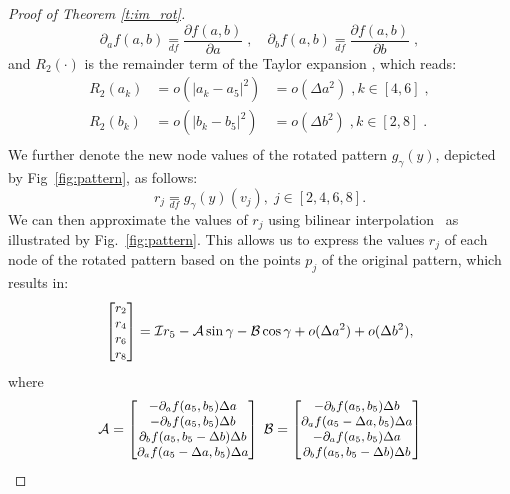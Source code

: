 \documentclass[10pt,journal,compsoc]{IEEEtran}
\newcommand{\df}{\mathop{=}\limits_{df}}
\begin{document}
\begin{proof}[Proof of Theorem \ref{t:im_rot}]
		\begin{equation}
		\partial_a f(a,b) \df \frac{\partial f(a, b)}{\partial a}\;, \quad \partial_b f(a,b) \df \frac{\partial f(a, b)}{\partial b} \;,
		\end{equation}
		and $R_2(\cdot)$ is the remainder term of the Taylor expansion%
		, which reads:
		\begin{equation}
		\begin{array}{rll}
		R_2(a_k) &= o(|a_k-a_5|^2) &= o(\Delta a^2) \;, k \in [4,6] \;, \\
		R_2(b_k) &= o(|b_k-b_5|^2) &= o(\Delta b^2) \;, k \in [2,8] \;.\\
		\end{array}
		\end{equation}
		\noindent
		We further denote the new node values of the rotated pattern $g_\gamma(y)$, depicted by Fig~\ref{fig:pattern}, as follows:
		\begin{equation}
		r_j \df g_\gamma(y)(v_j),\;  j \in [2,4,6,8].
		\label{eq:rj}
		\end{equation}
		\noindent
		We can then approximate the values of $r_j$ using bilinear interpolation~\cite{bb:Szeliski10} as illustrated by Fig.~\ref{fig:pattern}. This allows us to express the values $r_j$ of each node of the rotated pattern based on the points $p_j$ of the original pattern, which results in:
		\begin{equation}
		\small
		\begin{bmatrix}
		r_2 \\ r_4 \\ r_6 \\ r_8 \\
		\end{bmatrix} =
		\mathcal{I}  r_5 - \mathcal{A} \sin \gamma
		- \mathcal{B} \cos \gamma
		+ o(\Delta a^2) + o(\Delta b^2),
		\label{eq:points_r}
		\end{equation}
		\noindent
		where
		\begin{equation}
		\small
		\mathcal{A} =
		\begin{bmatrix}
		- \partial_a f(a_5, b_5)\Delta a \\
		- \partial_b f(a_5, b_5)\Delta b \\
		\partial_b f (a_5, b_5-\Delta b)\Delta b \\
		\partial_a f (a_5-\Delta a, b_5)\Delta a \\
		\end{bmatrix}\;
		\mathcal{B} =
		\begin{bmatrix}
		- \partial_b f (a_5, b_5)\Delta b \\
		\partial_a f(a_5-\Delta a, b_5)\Delta a \\
		- \partial_a f (a_5, b_5)\Delta a \\
		\partial_b f (a_5, b_5-\Delta b)\Delta b \\
		\end{bmatrix}
		\label{eq:points_r_notations}
		\end{equation}


\end{proof}
\end{document}
